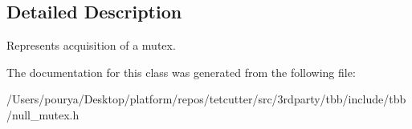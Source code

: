 \subsection{Detailed Description}
Represents acquisition of a mutex. 

The documentation for this class was generated from the following file\+:\begin{DoxyCompactItemize}
\item 
/\+Users/pourya/\+Desktop/platform/repos/tetcutter/src/3rdparty/tbb/include/tbb/null\+\_\+mutex.\+h\end{DoxyCompactItemize}
